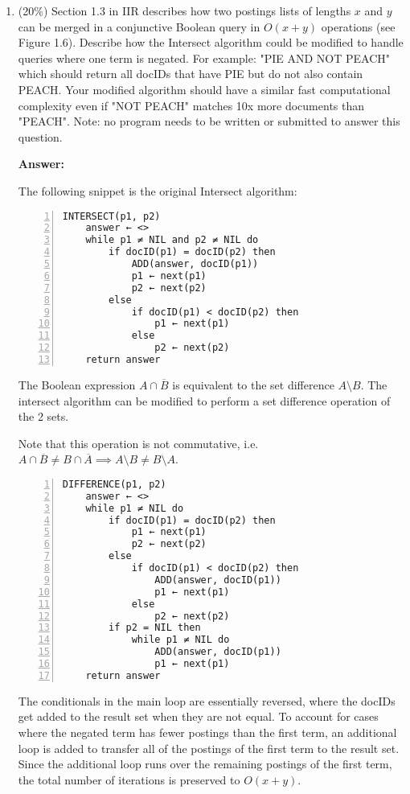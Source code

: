 \documentclass[11pt]{article}
\begin{document}
\begin{enumerate}
        \item (20\%) Section 1.3 in IIR describes how two postings lists of lengths $x$ and $y$ can be merged in a conjunctive Boolean query in $O(x+y)$ operations (see Figure 1.6). Describe how the Intersect algorithm could be modified to handle queries where one term is negated. For example: "PIE AND NOT PEACH" which should return all docIDs that have PIE but do not also contain PEACH. Your modified algorithm should have a similar fast computational complexity even if "NOT PEACH" matches 10x more documents than "PEACH". Note: no program needs to be written or submitted to answer this question.
        
        \textbf{Answer:}
        
        The following snippet is the original Intersect algorithm:
        
\begin{lstlisting}[caption={Intersect Algorithm from Figure 1.6}, numbers=left]
INTERSECT(p1, p2)
    answer ← <>
    while p1 ≠ NIL and p2 ≠ NIL do
        if docID(p1) = docID(p2) then
            ADD(answer, docID(p1))
            p1 ← next(p1)
            p2 ← next(p2)
        else
            if docID(p1) < docID(p2) then
                p1 ← next(p1)
            else
                p2 ← next(p2)
    return answer
\end{lstlisting}
        
        The Boolean expression $A \cap \overline{B}$ is equivalent to the set difference $A \setminus B$. The intersect algorithm can be modified to perform a set difference operation of the 2 sets.
        
        Note that this operation is not commutative, i.e. $A \cap \overline{B} \neq B \cap \overline{A} \implies A \setminus B \neq B \setminus A$.
        
\begin{lstlisting}[caption={Intersect Algorithm Modified to Negate the Second Term}, numbers=left]
DIFFERENCE(p1, p2)
    answer ← <>
    while p1 ≠ NIL do
        if docID(p1) = docID(p2) then
            p1 ← next(p1)
            p2 ← next(p2)
        else
            if docID(p1) < docID(p2) then
                ADD(answer, docID(p1))
                p1 ← next(p1)
            else
                p2 ← next(p2)
        if p2 = NIL then
            while p1 ≠ NIL do
                ADD(answer, docID(p1))
                p1 ← next(p1)
    return answer
\end{lstlisting}

        The conditionals in the main loop are essentially reversed, where the docIDs get added to the result set when they are not equal. To account for cases where the negated term has fewer postings than the first term, an additional loop is added to transfer all of the postings of the first term to the result set. Since the additional loop runs over the remaining postings of the first term, the total number of iterations is preserved to $O(x+y)$.
        

\end{enumerate}
\end{document}
